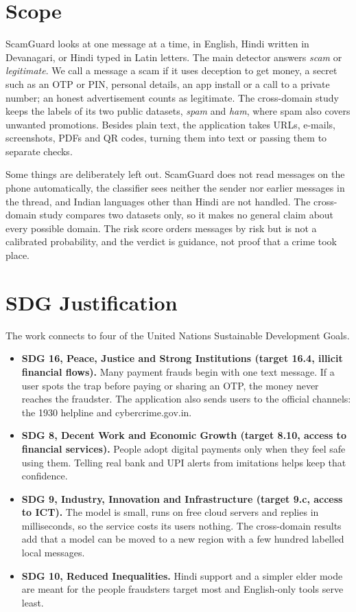 \section{Scope}
ScamGuard looks at one message at a time, in English, Hindi written in Devanagari, or Hindi typed in Latin letters. The main detector answers \emph{scam} or \emph{legitimate}. We call a message a scam if it uses deception to get money, a secret such as an OTP or PIN, personal details, an app install or a call to a private number; an honest advertisement counts as legitimate. The cross-domain study keeps the labels of its two public datasets, \emph{spam} and \emph{ham}, where spam also covers unwanted promotions. Besides plain text, the application takes URLs, e-mails, screenshots, PDFs and QR codes, turning them into text or passing them to separate checks.

Some things are deliberately left out. ScamGuard does not read messages on the phone automatically, the classifier sees neither the sender nor earlier messages in the thread, and Indian languages other than Hindi are not handled. The cross-domain study compares two datasets only, so it makes no general claim about every possible domain. The risk score orders messages by risk but is not a calibrated probability, and the verdict is guidance, not proof that a crime took place.

\section{SDG Justification}
The work connects to four of the United Nations Sustainable Development Goals.
\begin{itemize}
\item \textbf{SDG 16, Peace, Justice and Strong Institutions (target 16.4, illicit financial flows).} Many payment frauds begin with one text message. If a user spots the trap before paying or sharing an OTP, the money never reaches the fraudster. The application also sends users to the official channels: the 1930 helpline and cybercrime.gov.in.
\item \textbf{SDG 8, Decent Work and Economic Growth (target 8.10, access to financial services).} People adopt digital payments only when they feel safe using them. Telling real bank and UPI alerts from imitations helps keep that confidence.
\item \textbf{SDG 9, Industry, Innovation and Infrastructure (target 9.c, access to ICT).} The model is small, runs on free cloud servers and replies in milliseconds, so the service costs its users nothing. The cross-domain results add that a model can be moved to a new region with a few hundred labelled local messages.
\item \textbf{SDG 10, Reduced Inequalities.} Hindi support and a simpler elder mode are meant for the people fraudsters target most and English-only tools serve least.
\end{itemize}

